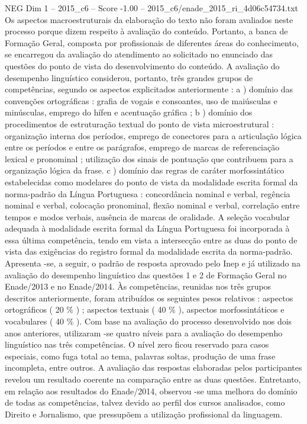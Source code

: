 \begin{textsample}{NEG Dim 1 – 2015\_c6 – Score -1.00 – 2015\_c6/enade\_2015\_ri\_4d06c54734.txt}
Os aspectos macroestruturais da elaboração do texto não foram avaliados neste processo porque dizem respeito à avaliação do conteúdo.
Portanto, a banca de Formação Geral, composta por profissionais de diferentes áreas do conhecimento, se encarregou da avaliação do atendimento ao solicitado no enunciado das questões do ponto de vista do desenvolvimento do conteúdo.
A avaliação do desempenho linguístico considerou, portanto, três grandes grupos de competências, segundo os aspectos explicitados anteriormente : a ) domínio das convenções ortográficas : grafia de vogais e consoantes, uso de maiúsculas e minúsculas, emprego do hífen e acentuação gráfica ; b ) domínio dos procedimentos de estruturação textual do ponto de vista microestrutural : organização interna dos períodos, emprego de conectores para a articulação lógica entre os períodos e entre os parágrafos, emprego de marcas de referenciação lexical e pronominal ; utilização dos sinais de pontuação que contribuem para a organização lógica da frase. c ) domínio das regras de caráter morfossintático estabelecidas como modelares do ponto de vista da modalidade escrita formal da norma-padrão da Língua Portuguesa : concordância nominal e verbal, regência nominal e verbal, colocação pronominal, flexão nominal e verbal, correlação entre tempos e modos verbais, ausência de marcas de oralidade.
A seleção vocabular adequada à modalidade escrita formal da Língua Portuguesa foi incorporada à essa última competência, tendo em vista a intersecção entre as duas do ponto de vista das exigências do registro formal da modalidade escrita da norma-padrão.
Apresenta -se, a seguir, o padrão de resposta aprovado pelo Inep e já utilizado na avaliação do desempenho linguístico das questões 1 e 2 de Formação Geral no Enade/2013 e no Enade/2014.
Às competências, reunidas nos três grupos descritos anteriormente, foram atribuídos os seguintes pesos relativos : aspectos ortográficos ( 20 \% ) ; aspectos textuais ( 40 \% ), aspectos morfossintáticos e vocabulares ( 40 \% ).
Com base na avaliação do processo desenvolvido nos dois anos anteriores, utilizaram -se quatro níveis para a avaliação do desempenho linguístico nas três competências.
O nível zero ficou reservado para casos especiais, como fuga total ao tema, palavras soltas, produção de uma frase incompleta, entre outros.
A avaliação das respostas elaboradas pelos participantes revelou um resultado coerente na comparação entre as duas questões.
Entretanto, em relação aos resultados do Enade/2014, observou -se uma melhora do domínio de todas as competências, talvez devido ao perfil dos cursos analisados, como Direito e Jornalismo, que pressupõem a utilização profissional da linguagem.

\end{textsample}
